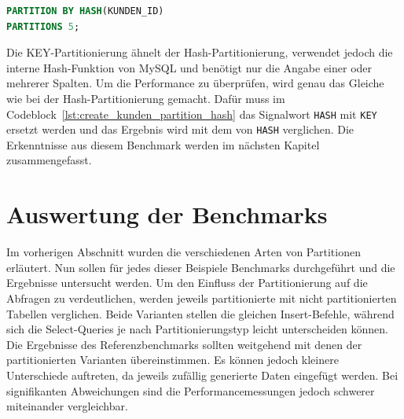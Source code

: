 \vspace{-7pt}
\begin{lstlisting}[language=SQL,caption=Hash-Partitonierung,label={lst:create_kunden_partition_hash}]
PARTITION BY HASH(KUNDEN_ID)
PARTITIONS 5;
\end{lstlisting}
\vspace{-5pt}

Die KEY-Partitionierung ähnelt der Hash-Partitionierung, verwendet jedoch die interne Hash-Funktion von MySQL und benötigt nur die Angabe einer oder mehrerer Spalten.
Um die Performance zu überprüfen, wird genau das Gleiche wie bei der Hash-Partitionierung gemacht.
Dafür muss im Codeblock~\ref{lst:create_kunden_partition_hash} das Signalwort \texttt{HASH} mit \texttt{KEY} ersetzt werden und das Ergebnis wird mit dem von \texttt{HASH} verglichen.
Die Erkenntnisse aus diesem Benchmark werden im nächsten Kapitel zusammengefasst.

\section{Auswertung der Benchmarks}\label{sec:partition-analyse}

Im vorherigen Abschnitt wurden die verschiedenen Arten von Partitionen erläutert.
Nun sollen für jedes dieser Beispiele Benchmarks durchgeführt und die Ergebnisse untersucht werden.
Um den Einfluss der Partitionierung auf die Abfragen zu verdeutlichen, werden jeweils partitionierte mit nicht partitionierten Tabellen verglichen.
Beide Varianten stellen die gleichen Insert-Befehle, während sich die Select-Queries je nach Partitionierungstyp leicht unterscheiden können.
Die Ergebnisse des Referenzbenchmarks sollten weitgehend mit denen der partitionierten Varianten übereinstimmen.
Es können jedoch kleinere Unterschiede auftreten, da jeweils zufällig generierte Daten eingefügt werden.
Bei signifikanten Abweichungen sind die Performancemessungen jedoch schwerer miteinander vergleichbar.

